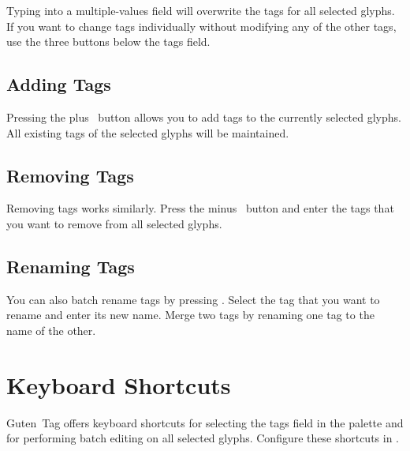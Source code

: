 \bigbreak\noindent%

\bigbreak\noindent Typing into a multiple-values field will overwrite the tags for all selected glyphs.
If you want to change tags individually without modifying any of the other tags, use the three buttons below the tags field.

\subsection{Adding Tags}%
\label{sub:add_tags}

Pressing the plus~ button allows you to add tags to the currently selected glyphs.
All existing tags of the selected glyphs will be maintained.

\medbreak\noindent%

\subsection{Removing Tags}%
\label{sub:remove_tags}

Removing tags works similarly.
Press the minus~ button and enter the tags that you want to remove from all selected glyphs.

\medbreak\noindent%

\subsection{Renaming Tags}%
\label{sub:rename_tags}

You can also batch rename tags by pressing .
Select the tag that you want to rename and enter its new name.
Merge two tags by renaming one tag to the name of the other.

\medbreak\noindent%

\section{Keyboard Shortcuts}%
\label{sec:keyboard-shortcuts}

Guten~Tag offers keyboard shortcuts for selecting the tags field in the palette and for performing batch editing on all selected glyphs.
Configure these shortcuts in .

